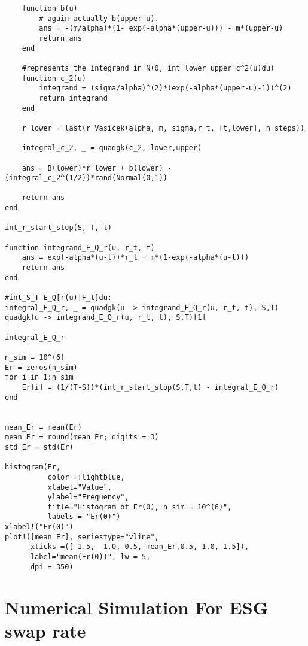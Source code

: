\begin{verbatim}
    function b(u)
        # again actually b(upper-u). 
        ans = -(m/alpha)*(1- exp(-alpha*(upper-u))) - m*(upper-u)
        return ans
    end

    #represents the integrand in N(0, int_lower_upper c^2(u)du)
    function c_2(u)
        integrand = (sigma/alpha)^(2)*(exp(-alpha*(upper-u)-1))^(2)
        return integrand
    end

    r_lower = last(r_Vasicek(alpha, m, sigma,r_t, [t,lower], n_steps))

    integral_c_2, _ = quadgk(c_2, lower,upper)

    ans = B(lower)*r_lower + b(lower) - (integral_c_2^(1/2))*rand(Normal(0,1))

    return ans
end 

int_r_start_stop(S, T, t)

function integrand_E_Q_r(u, r_t, t)
    ans = exp(-alpha*(u-t))*r_t + m*(1-exp(-alpha*(u-t)))
    return ans
end

#int_S_T E_Q[r(u)|F_t]du:
integral_E_Q_r, _ = quadgk(u -> integrand_E_Q_r(u, r_t, t), S,T)
quadgk(u -> integrand_E_Q_r(u, r_t, t), S,T)[1]

integral_E_Q_r

n_sim = 10^(6)
Er = zeros(n_sim)
for i in 1:n_sim
    Er[i] = (1/(T-S))*(int_r_start_stop(S,T,t) - integral_E_Q_r)
end


mean_Er = mean(Er)
mean_Er = round(mean_Er; digits = 3)
std_Er = std(Er)

histogram(Er, 
          color =:lightblue, 
          xlabel="Value", 
          ylabel="Frequency", 
          title="Histogram of Er(0), n_sim = 10^(6)", 
          labels = "Er(0)")
xlabel!("Er(0)")
plot!([mean_Er], seriestype="vline",
      xticks =([-1.5, -1.0, 0.5, mean_Er,0.5, 1.0, 1.5]), 
      label="mean(Er(0))", lw = 5, 
      dpi = 350)
\end{verbatim}

\newpage 

\section{Numerical Simulation For ESG swap rate}

